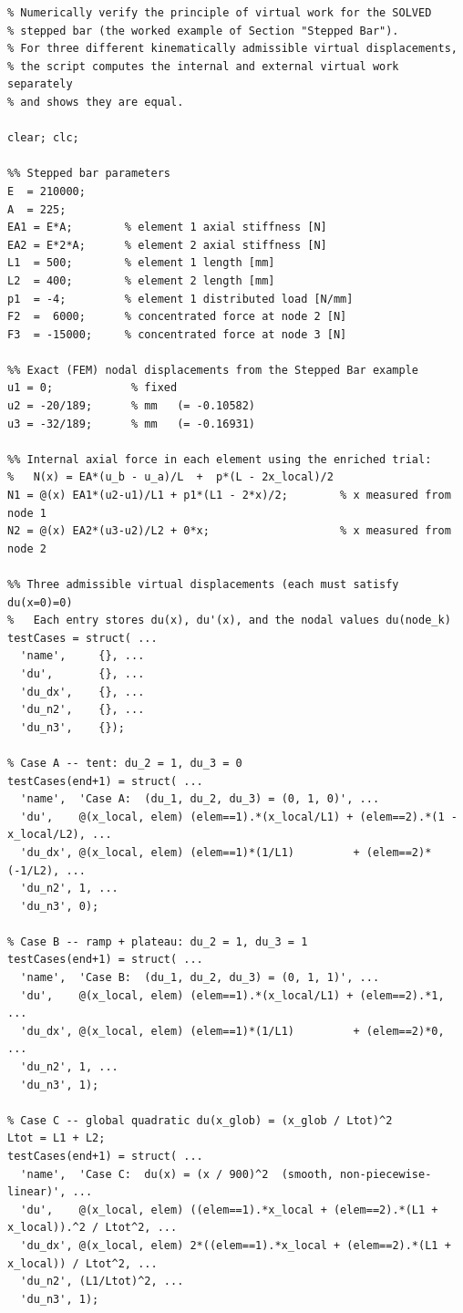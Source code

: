 \begin{lstlisting}[caption={PVW verification for the stepped bar (Chapter~\ref{ch:1d})},
                   label={code:pvw_verification}]
% pvw_verification_stepped_bar.m
% Numerically verify the principle of virtual work for the SOLVED
% stepped bar (the worked example of Section "Stepped Bar").
% For three different kinematically admissible virtual displacements,
% the script computes the internal and external virtual work separately
% and shows they are equal.

clear; clc;

%% Stepped bar parameters
E  = 210000;
A  = 225;
EA1 = E*A;        % element 1 axial stiffness [N]
EA2 = E*2*A;      % element 2 axial stiffness [N]
L1  = 500;        % element 1 length [mm]
L2  = 400;        % element 2 length [mm]
p1  = -4;         % element 1 distributed load [N/mm]
F2  =  6000;      % concentrated force at node 2 [N]
F3  = -15000;     % concentrated force at node 3 [N]

%% Exact (FEM) nodal displacements from the Stepped Bar example
u1 = 0;            % fixed
u2 = -20/189;      % mm   (= -0.10582)
u3 = -32/189;      % mm   (= -0.16931)

%% Internal axial force in each element using the enriched trial:
%   N(x) = EA*(u_b - u_a)/L  +  p*(L - 2x_local)/2
N1 = @(x) EA1*(u2-u1)/L1 + p1*(L1 - 2*x)/2;        % x measured from node 1
N2 = @(x) EA2*(u3-u2)/L2 + 0*x;                    % x measured from node 2

%% Three admissible virtual displacements (each must satisfy du(x=0)=0)
%   Each entry stores du(x), du'(x), and the nodal values du(node_k)
testCases = struct( ...
  'name',     {}, ...
  'du',       {}, ...
  'du_dx',    {}, ...
  'du_n2',    {}, ...
  'du_n3',    {});

% Case A -- tent: du_2 = 1, du_3 = 0
testCases(end+1) = struct( ...
  'name',  'Case A:  (du_1, du_2, du_3) = (0, 1, 0)', ...
  'du',    @(x_local, elem) (elem==1).*(x_local/L1) + (elem==2).*(1 - x_local/L2), ...
  'du_dx', @(x_local, elem) (elem==1)*(1/L1)         + (elem==2)*(-1/L2), ...
  'du_n2', 1, ...
  'du_n3', 0);

% Case B -- ramp + plateau: du_2 = 1, du_3 = 1
testCases(end+1) = struct( ...
  'name',  'Case B:  (du_1, du_2, du_3) = (0, 1, 1)', ...
  'du',    @(x_local, elem) (elem==1).*(x_local/L1) + (elem==2).*1, ...
  'du_dx', @(x_local, elem) (elem==1)*(1/L1)         + (elem==2)*0, ...
  'du_n2', 1, ...
  'du_n3', 1);

% Case C -- global quadratic du(x_glob) = (x_glob / Ltot)^2
Ltot = L1 + L2;
testCases(end+1) = struct( ...
  'name',  'Case C:  du(x) = (x / 900)^2  (smooth, non-piecewise-linear)', ...
  'du',    @(x_local, elem) ((elem==1).*x_local + (elem==2).*(L1 + x_local)).^2 / Ltot^2, ...
  'du_dx', @(x_local, elem) 2*((elem==1).*x_local + (elem==2).*(L1 + x_local)) / Ltot^2, ...
  'du_n2', (L1/Ltot)^2, ...
  'du_n3', 1);


\end{lstlisting}
